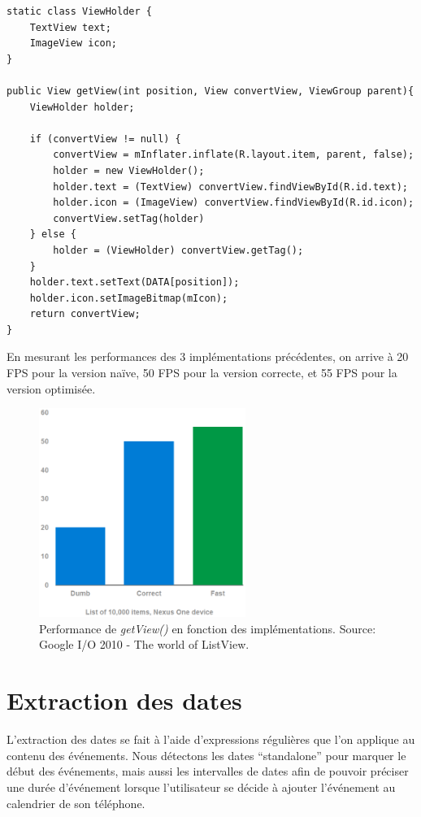\begin{adjustbox}{minipage=1.14\textwidth,margin=0pt \smallskipamount,center}
\begin{lstlisting}[style=Java, label=listview3, caption=Version optimisée]
static class ViewHolder {
	TextView text;
	ImageView icon;
}

public View getView(int position, View convertView, ViewGroup parent){ 
	ViewHolder holder;

	if (convertView != null) {
		convertView = mInflater.inflate(R.layout.item, parent, false);
		holder = new ViewHolder();
		holder.text = (TextView) convertView.findViewById(R.id.text);
		holder.icon = (ImageView) convertView.findViewById(R.id.icon);
		convertView.setTag(holder)
	} else {
		holder = (ViewHolder) convertView.getTag();
	}
	holder.text.setText(DATA[position]); 
	holder.icon.setImageBitmap(mIcon);
	return convertView; 
}
\end{lstlisting}
\end{adjustbox}

\newpage
En mesurant les performances des 3 implémentations précédentes, on arrive à 20 FPS pour la version naïve, 50 FPS pour la version correcte, et 55 FPS pour la version optimisée.\\

\begin{figure}[h]
  \center
  \includegraphics[width=0.6\textwidth]{resources/google_io_2010.png}
  \caption{Performance de \emph{getView()} en fonction des implémentations. Source: Google I/O 2010 - The world of ListView.}
  \label{fig:google_io_2010}
\end{figure}

\newpage
\section{Extraction des dates}
L’extraction des dates se fait à l’aide d’expressions régulières que l’on applique au contenu des événements. Nous détectons les dates “standalone” pour marquer le début des événements, mais aussi les intervalles de dates afin de pouvoir préciser une durée d’événement lorsque l’utilisateur se décide à ajouter l’événement au calendrier de son téléphone.